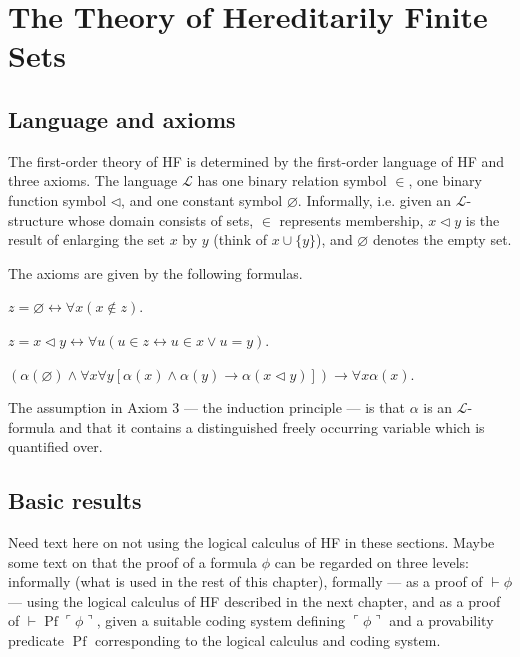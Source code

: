 \chapter{The Theory of Hereditarily Finite Sets}

\section{Language and axioms}

The first-order theory of HF is determined by the first-order language of HF and three axioms.
The language $\mathcal{L}$ has one binary relation symbol $\in$, one binary function symbol $\lhd$, 
and one constant symbol $\varnothing$.
Informally, i.e. given an $\mathcal{L}$-structure whose domain consists of sets,  
$\in$ represents membership, $x \lhd y$ is the result of enlarging the set $x$ by $y$ 
(think of $x \cup \{y\}$), and $\varnothing$ denotes the empty set.

The axioms are given by the following formulas.

\begin{axiom}
    \label{ax:empty}
    \leanok
    $z=\varnothing \leftrightarrow \forall x(x \notin z)$.
\end {axiom}

\begin{axiom}
    \label{ax:enlarge}
    \leanok
    $z=x \lhd y \leftrightarrow \forall u(u \in z \leftrightarrow u \in x \lor u=y)$.
\end {axiom}

\begin{axiom}
    \label{ax:induction}
    \leanok
    $(\alpha(\varnothing) \land \forall x \forall y[\alpha(x) \land \alpha(y) \rightarrow 
    \alpha(x \lhd y)]) \rightarrow \forall x \alpha(x)$.
\end {axiom}

The assumption in Axiom 3 — the induction principle — is that $\alpha$ is an $\mathcal{L}$-formula
and that it contains a distinguished freely occurring variable which is quantified over.

\section{Basic results}

Need text here on not using the logical calculus of HF in these sections. 
Maybe some text on that the proof of a formula $\phi$ can be regarded on three levels: 
informally (what is used in the rest of this chapter), formally — as a proof of $\vdash \phi$ — 
using the logical calculus of HF described in the next chapter, 
and as a proof of $\vdash \operatorname{Pf}\ulcorner \phi \urcorner$, 
given a suitable coding system defining $\ulcorner \phi \urcorner$ and a provability predicate 
$\operatorname{Pf}$ corresponding to the logical calculus and coding system.

